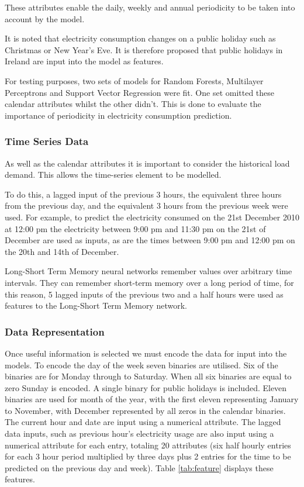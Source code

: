 These attributes enable the daily, weekly and annual periodicity to be taken into account by the model.

It is noted that electricity consumption changes on a public holiday such as Christmas or New Year's Eve. It is therefore proposed that public holidays in Ireland are input into the model as features. 

For testing purposes, two sets of models for Random Forests, Multilayer Perceptrons and Support Vector Regression were fit. One set omitted these calendar attributes whilst the other didn't. This is done to evaluate the importance of periodicity in electricity consumption prediction.

\subsubsection{Time Series Data}

As well as the calendar attributes it is important to consider the historical load demand. This allows the time-series element to be modelled.  

To do this, a lagged input of the previous 3 hours, the equivalent three hours from the previous day, and the equivalent 3 hours from the previous week were used. For example, to predict the electricity consumed on the 21st December 2010 at 12:00 pm the electricity between 9:00 pm and 11:30 pm on the 21st of December are used as inputs, as are the times between 9:00 pm and 12:00 pm on the 20th and 14th of December.

Long-Short Term Memory neural networks remember values over arbitrary time intervals. They can remember short-term memory over a long period of time, for this reason, 5 lagged inputs of the previous two and a half hours were used as features to the Long-Short Term Memory network.

\subsubsection{Data Representation}

Once useful information is selected we must encode the data for input into the models. To encode the day of the week seven binaries are utilised. Six of the binaries are for Monday through to Saturday. When all six binaries are equal to zero Sunday is encoded. A single binary for public holidays is included. Eleven binaries are used for month of the year, with the first eleven representing January to November, with December represented by all zeros in the calendar binaries. The current hour and date are input using a numerical attribute. The lagged data inputs, such as previous hour's electricity usage are also input using a numerical attribute for each entry, totaling 20 attributes (six half hourly entries for each 3 hour period multiplied by three days plus 2 entries for the time to be predicted on the previous day and week). Table \ref{tab:feature} displays these features.


